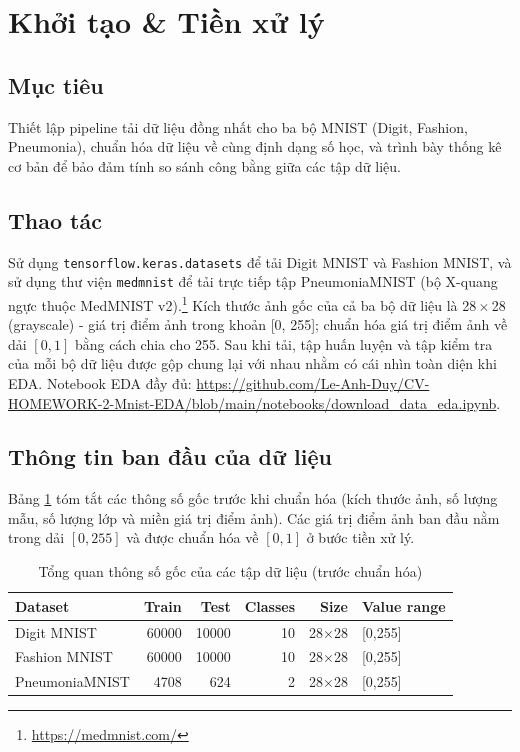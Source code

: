 \documentclass[a4paper,12pt]{report}
\begin{document}
\newpage
\tableofcontents
\newpage

\section{Khởi tạo \& Tiền xử lý}
\subsection{Mục tiêu}
Thiết lập pipeline tải dữ liệu đồng nhất cho ba bộ MNIST (Digit, Fashion, Pneumonia), chuẩn hóa dữ liệu về cùng định dạng số học, và trình bày thống kê cơ bản để bảo đảm tính so sánh công bằng giữa các tập dữ liệu.

\subsection{Thao tác}
Sử dụng \texttt{tensorflow.keras.datasets} để tải Digit MNIST và Fashion MNIST, và sử dụng thư viện \texttt{medmnist} để tải trực tiếp tập PneumoniaMNIST (bộ X-quang ngực thuộc MedMNIST v2).\footnote{\url{https://medmnist.com/}} Kích thước ảnh gốc của cả ba bộ dữ liệu là 28\,$\times$\,28 (grayscale) - giá trị điểm ảnh trong khoản [0, 255]; chuẩn hóa giá trị điểm ảnh về dải $[0,1]$ bằng cách chia cho 255. Sau khi tải, tập huấn luyện và tập kiểm tra của mỗi bộ dữ liệu được gộp chung lại với nhau nhằm có cái nhìn toàn diện khi EDA. Notebook EDA đầy đủ: \url{https://github.com/Le-Anh-Duy/CV-HOMEWORK-2-Mnist-EDA/blob/main/notebooks/download_data_eda.ipynb}.

\subsection{Thông tin ban đầu của dữ liệu}
Bảng \ref{tab:raw-dataset-summary} tóm tắt các thông số gốc trước khi chuẩn hóa (kích thước ảnh, số lượng mẫu, số lượng lớp và miền giá trị điểm ảnh). Các giá trị điểm ảnh ban đầu nằm trong dải $[0,255]$ và được chuẩn hóa về $[0,1]$ ở bước tiền xử lý.

\begin{table}[H]
    \centering
    \caption{Tổng quan thông số gốc của các tập dữ liệu (trước chuẩn hóa)}
    \label{tab:raw-dataset-summary}
    \begin{tabular}{lrrrrl}
        \toprule
        \textbf{Dataset} & \textbf{Train} & \textbf{Test} & \textbf{Classes} & \textbf{Size} & \textbf{Value range} \\
        \midrule
        Digit MNIST & 60000 & 10000 & 10 & 28$\times$28 & [0,255] \\
        Fashion MNIST & 60000 & 10000 & 10 & 28$\times$28 & [0,255] \\
        PneumoniaMNIST & 4708 & 624 & 2 & 28$\times$28 & [0,255] \\
        \bottomrule
    \end{tabular}
\end{table}
\end{document}
